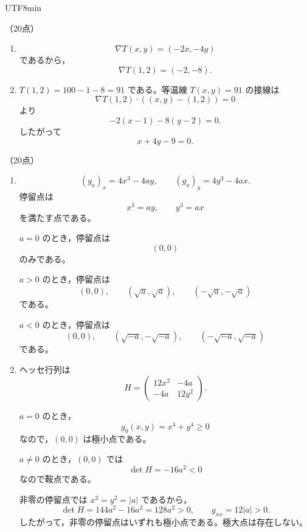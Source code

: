 \documentclass[a4paper,12pt]{article}
\newcommand{\problem}[2][10]{\par\vspace{0.85em}\noindent{\large 問題 #2}\quad（#1点）\quad\ignorespaces}
\begin{document}
\begin{CJK}{UTF8}{min}
\problem[20]{7}
\begin{enumerate}[label=(\alph*)]
\item
\[
\nabla T(x,y)=(-2x,-4y)
\]
であるから，
\[
\nabla T(1,2)=(-2,-8).
\]

\item
$T(1,2)=100-1-8=91$ である。等温線 $T(x,y)=91$ の接線は
\[
\nabla T(1,2)\cdot ((x,y)-(1,2))=0
\]
より
\[
-2(x-1)-8(y-2)=0.
\]
したがって
\[
x+4y-9=0.
\]
\end{enumerate}

\problem[20]{8}
\begin{enumerate}[label=(\alph*)]
\item
\[
(g_a)_x=4x^3-4ay,\qquad (g_a)_y=4y^3-4ax.
\]
停留点は
\[
x^3=ay,\qquad y^3=ax
\]
を満たす点である。

$a=0$ のとき，停留点は
\[
(0,0)
\]
のみである。

$a>0$ のとき，停留点は
\[
(0,0),\qquad (\sqrt a,\sqrt a),\qquad (-\sqrt a,-\sqrt a)
\]
である。

$a<0$ のとき，停留点は
\[
(0,0),\qquad (\sqrt{-a},-\sqrt{-a}),\qquad (-\sqrt{-a},\sqrt{-a})
\]
である。

\item
ヘッセ行列は
\[
H=
\begin{pmatrix}
12x^2 & -4a\\
-4a & 12y^2
\end{pmatrix}.
\]

$a=0$ のとき，
\[
g_0(x,y)=x^4+y^4\ge 0
\]
なので，$(0,0)$ は極小点である。

$a\ne 0$ のとき，$(0,0)$ では
\[
\det H=-16a^2<0
\]
なので鞍点である。

非零の停留点では $x^2=y^2=|a|$ であるから，
\[
\det H=144a^2-16a^2=128a^2>0,\qquad
g_{xx}=12|a|>0.
\]
したがって，非零の停留点はいずれも極小点である。極大点は存在しない。
\end{enumerate}

\ifPDFTeX
\end{CJK}
\fi
\end{document}
